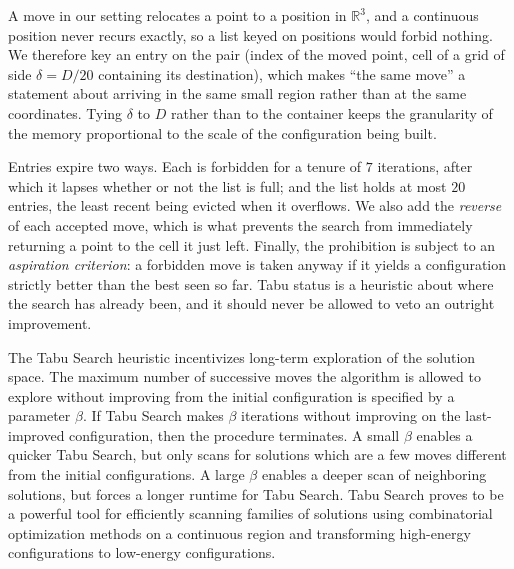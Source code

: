 \documentclass[preprint,12pt]{elsarticle}
\theoremstyle{remark}
\def \R {\mathbb{R}}
\begin{document}
A move in our setting relocates a point to a position in $\R^3$, and a
continuous position never recurs exactly, so a list keyed on positions would
forbid nothing. We therefore key an entry on the pair (index of the moved point,
cell of a grid of side $\delta = D/20$ containing its destination), which makes
``the same move'' a statement about arriving in the same small region rather
than at the same coordinates. Tying $\delta$ to $D$ rather than to the container
keeps the granularity of the memory proportional to the scale of the
configuration being built.

Entries expire two ways. Each is forbidden for a tenure of $7$ iterations, after
which it lapses whether or not the list is full; and the list holds at most $20$
entries, the least recent being evicted when it overflows. We also add the
\emph{reverse} of each accepted move, which is what prevents the search from
immediately returning a point to the cell it just left. Finally, the prohibition
is subject to an \textit{aspiration criterion}: a forbidden move is taken anyway
if it yields a configuration strictly better than the best seen so far. Tabu
status is a heuristic about where the search has already been, and it should
never be allowed to veto an outright improvement.

The Tabu Search heuristic incentivizes long-term exploration of the solution
space. The maximum number of successive moves the algorithm is allowed to
explore without improving from the initial configuration is specified by a
parameter $\beta$. If Tabu Search makes $\beta$ iterations without improving on
the last-improved configuration, then the procedure terminates. A small $\beta$
enables a quicker Tabu Search, but only scans for solutions which are a few
moves different from the initial configurations. A large $\beta$ enables a
deeper scan of neighboring solutions, but forces a longer runtime for Tabu
Search. Tabu Search proves to be a powerful tool for efficiently scanning
families of solutions using combinatorial optimization methods on a continuous
region and transforming high-energy configurations to low-energy configurations.
\end{document}
